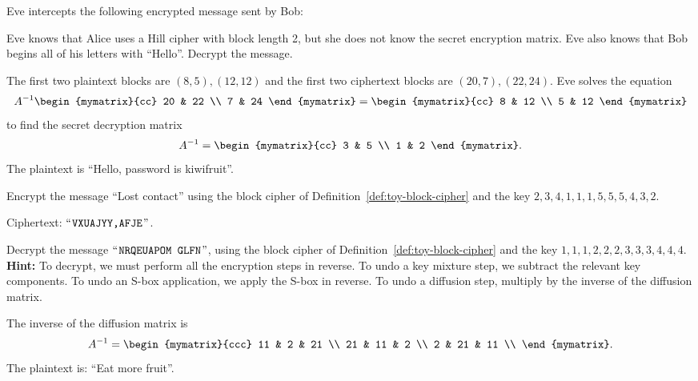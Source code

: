 \begin{ex}
  Eve intercepts the following encrypted message sent by Bob:
  \begin{center}
  \end{center}
  Eve knows that Alice uses a Hill cipher with block length 2, but she
  does not know the secret encryption matrix. Eve also knows that
  Bob begins all of his letters with ``Hello''. Decrypt the message.
  \begin{sol}
    The first two plaintext blocks are $(8,5),(12,12)$ and the first
    two ciphertext blocks are $(20,7),(22,24)$. Eve solves the equation
    \begin{equation*}
      A^{-1} \begin{mymatrix}{cc} 20 & 22 \\ 7 & 24 \end{mymatrix}
      = \begin{mymatrix}{cc} 8 & 12 \\ 5 & 12 \end{mymatrix}
    \end{equation*}
    to find the secret decryption matrix
    \begin{equation*}
      A^{-1} = \begin{mymatrix}{cc} 3 & 5 \\ 1 & 2 \end{mymatrix}.
    \end{equation*}
    The plaintext is ``Hello, password is kiwifruit''.
  \end{sol}
\end{ex}

\begin{ex}
  Encrypt the message ``Lost contact'' using the block cipher of
  Definition~\ref{def:toy-block-cipher} and the key
  $2,3,4,1,1,1,5,5,5,4,3,2$.
  \begin{sol}
    Ciphertext: $\mbox{\rm``\hspace{.08333em}{\tt VXUAJYY,AFJE}\hspace{.08333em}''}$.
  \end{sol}
\end{ex}

\begin{ex}
  Decrypt the message $\mbox{\rm``\hspace{.08333em}{\tt NRQEUAPOM GLFN}\hspace{.08333em}''}$, using the block cipher of
  Definition~\ref{def:toy-block-cipher} and the key
  $1,1,1,2,2,2,3,3,3,4,4,4$. \textbf{Hint:} To decrypt, we must
  perform all the encryption steps in reverse. To undo a key mixture
  step, we subtract the relevant key components. To undo an S-box
  application, we apply the S-box in reverse. To undo a diffusion
  step, multiply by the inverse of the diffusion matrix.
  \begin{sol}
    The inverse of the diffusion matrix is
    \begin{equation*}
      A^{-1} = \begin{mymatrix}{ccc}
        11 & 2 & 21 \\
        21 & 11 & 2 \\
        2 & 21 & 11 \\
      \end{mymatrix}.
    \end{equation*}
    The plaintext is: ``Eat more fruit''.
  \end{sol}
\end{ex}
